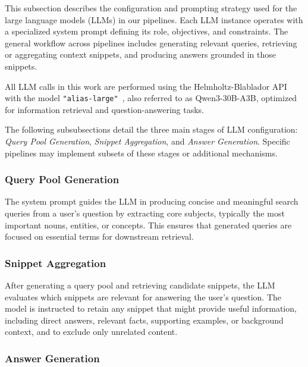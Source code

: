 \documentclass[manuscript,screen]{acmart}
\begin{document}
\begin{CCSXML}
	This subsection describes the configuration and prompting strategy used for the large language models (LLMs) in our pipelines. Each LLM instance operates with a specialized system prompt defining its role, objectives, and constraints. The general workflow across pipelines includes generating relevant queries, retrieving or aggregating context snippets, and producing answers grounded in those snippets.
	
	All LLM calls in this work are performed using the Helmholtz-Blablador API~\cite{blablador_api} with the model \texttt{"alias-large"}~\cite{qwen3_model}, also referred to as Qwen3-30B-A3B, optimized for information retrieval and question-answering tasks.
	
	The following subsubsections detail the three main stages of LLM configuration: \textit{Query Pool Generation}, \textit{Snippet Aggregation}, and \textit{Answer Generation}. Specific pipelines may implement subsets of these stages or additional mechanisms.
	
		\subsubsection{Query Pool Generation}
		\label{subsubsec:query-pool-generation}
		
		The system prompt guides the LLM in producing concise and meaningful search queries from a user's question by extracting core subjects, typically the most important nouns, entities, or concepts. This ensures that generated queries are focused on essential terms for downstream retrieval.
		
		\subsubsection{Snippet Aggregation}
		\label{subsubsec:snippet-aggregation}
		
		After generating a query pool and retrieving candidate snippets, the LLM evaluates which snippets are relevant for answering the user's question. The model is instructed to retain any snippet that might provide useful information, including direct answers, relevant facts, supporting examples, or background context, and to exclude only unrelated content.
		
		\subsubsection{Answer Generation}
		\label{subsubsec:answer-generation}
		

\end{CCSXML}
\end{document}
